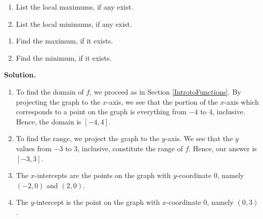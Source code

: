 \begin{ex}
\begin{multicols}{2}
\begin{enumerate}
\setcounter{HW}{\value{enumi}}
\end{enumerate}
\end{multicols}

\begin{multicols}{2}
\begin{enumerate}
\setcounter{enumi}{\value{HW}}

\item  List the local maximums, if any exist.

\item  List the local minimums, if any exist.

\setcounter{HW}{\value{enumi}}
\end{enumerate}
\end{multicols}

\begin{multicols}{2}
\begin{enumerate}
\setcounter{enumi}{\value{HW}}

\item  Find the maximum, if it exists.

\item  Find the minimum, if it exists.

\setcounter{HW}{\value{enumi}}
\end{enumerate}
\end{multicols}

\medskip

{\bf Solution.} 

\begin{enumerate}

\item  To find the domain of $f$, we proceed as in Section \ref{IntrotoFunctions}.  By projecting the graph to the $x$-axis, we see that the portion of the $x$-axis which corresponds to a point on the graph is everything from $-4$ to $4$, inclusive.  Hence, the domain is $[-4,4]$.

\item  To find the range, we project the graph to the $y$-axis.  We see that the $y$ values from $-3$ to $3$, inclusive, constitute the range of $f$.  Hence, our answer is $[-3,3]$.

\item  The $x$-intercepts are the points on the graph with $y$-coordinate $0$, namely $(-2,0)$ and $(2,0)$.

\item  The $y$-intercept is the point on the graph with $x$-coordinate $0$, namely $(0,3)$.


\end{enumerate}
\end{ex}
